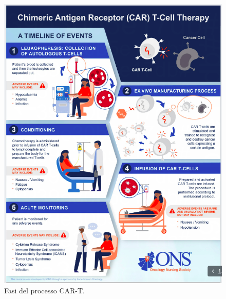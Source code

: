 \begin{figure}[H]
    \begin{center}
    \includegraphics[width=0.9\columnwidth]{img/CAR-T-PROCESS.png}
    \end{center}
    \caption{Fasi del processo CAR-T.
    \cite{ONSCART}}

\end{figure}

